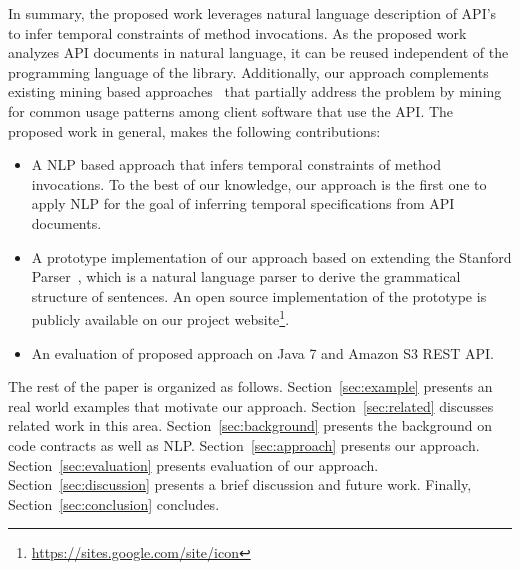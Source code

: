 In summary, the proposed work leverages natural language description of API's to infer temporal constraints of method invocations.
As the proposed work analyzes API documents in natural language, it can be reused independent of the programming language of the library.
Additionally, our approach complements existing mining based approaches~\cite{buse2012synthesizing, thummalapenta07parseweb, Wang:2013:MSR, Zhong:2009:MMR} that partially address the problem by mining for common usage patterns among client software that use the API.
The proposed work in general, makes the following contributions:


\begin{itemize}
	\item A NLP based approach that infers temporal constraints of method invocations. 
	To the best of our knowledge, our approach is the first one to apply NLP for the goal of inferring temporal specifications from API documents.
	\item A prototype implementation of our approach based on extending the Stanford Parser~\cite{Klein03,SNLP1}, which is a natural language parser to derive the grammatical structure of sentences.
	An open source implementation of the prototype is publicly available on our project website\footnote{\url{https://sites.google.com/site/icon}}. 
	\item An evaluation of proposed approach on Java 7 and Amazon S3 REST API.
\end{itemize}


The rest of the paper is organized as follows.
Section~\ref{sec:example} presents an real world examples that motivate our approach.
Section~\ref{sec:related} discusses related work in this area.
Section~\ref{sec:background} presents the  background on code contracts as well as NLP.
Section~\ref{sec:approach} presents our approach.
Section~\ref{sec:evaluation} presents evaluation of our approach.
Section~\ref{sec:discussion} presents a brief discussion and future work.
Finally, Section~\ref{sec:conclusion} concludes.


